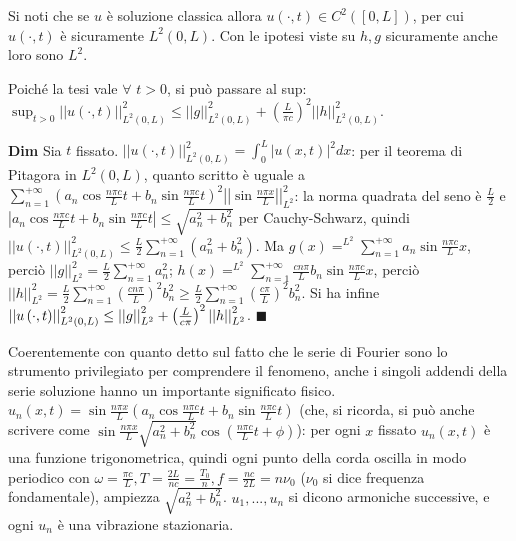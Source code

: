 \documentclass{article}
\begin{document}
Si noti che se $u$ \`{e} soluzione classica allora $u\left( \cdot ,t\right)
\in C^{2}\left( \left[ 0,L\right] \right) $, per cui $u\left( \cdot
,t\right) $ \`{e} sicuramente $L^{2}\left( 0,L\right) $. Con le ipotesi
viste su $h,g$ sicuramente anche loro sono $L^{2}$.

Poich\'{e} la tesi vale $\forall $ $t>0$, si pu\`{o} passare al sup: $%
\sup_{t>0}\left\vert \left\vert u\left( \cdot ,t\right) \right\vert
\right\vert _{L^{2}\left( 0,L\right) }^{2}\leq \left\vert \left\vert
g\right\vert \right\vert _{L^{2}\left( 0,L\right) }^{2}+\left( \frac{L}{\pi c%
}\right) ^{2}\left\vert \left\vert h\right\vert \right\vert _{L^{2}\left(
0,L\right) }^{2}$.

\textbf{Dim} Sia $t$ fissato. $\left\vert \left\vert u\left( \cdot ,t\right)
\right\vert \right\vert _{L^{2}\left( 0,L\right)
}^{2}=\int_{0}^{L}\left\vert u\left( x,t\right) \right\vert ^{2}dx$: per il
teorema di Pitagora in $L^{2}\left( 0,L\right) $, quanto scritto \`{e}
uguale a $\sum_{n=1}^{+\infty }\left( a_{n}\cos \frac{n\pi c}{L}t+b_{n}\sin 
\frac{n\pi c}{L}t\right) ^{2}\left\vert \left\vert \sin \frac{n\pi x}{L}%
\right\vert \right\vert _{L^{2}}^{2}$: la norma quadrata del seno \`{e} $%
\frac{L}{2}$ e $\left\vert a_{n}\cos \frac{n\pi c}{L}t+b_{n}\sin \frac{n\pi c%
}{L}t\right\vert \leq \sqrt{a_{n}^{2}+b_{n}^{2}}$ per Cauchy-Schwarz, quindi 
$\left\vert \left\vert u\left( \cdot ,t\right) \right\vert \right\vert
_{L^{2}\left( 0,L\right) }^{2}\leq \frac{L}{2}\sum_{n=1}^{+\infty }\left(
a_{n}^{2}+b_{n}^{2}\right) $. Ma $g\left( x\right)
=^{L^{2}}\sum_{n=1}^{+\infty }a_{n}\sin \frac{n\pi c}{L}x$, perci\`{o} $%
\left\vert \left\vert g\right\vert \right\vert _{L^{2}}^{2}=\frac{L}{2}%
\sum_{n=1}^{+\infty }a_{n}^{2}$; $h\left( x\right)
=^{L^{2}}\sum_{n=1}^{+\infty }\frac{cn\pi }{L}b_{n}\sin \frac{n\pi c}{L}x$,
perci\`{o} $\left\vert \left\vert h\right\vert \right\vert _{L^{2}}^{2}=%
\frac{L}{2}\sum_{n=1}^{+\infty }\left( \frac{cn\pi }{L}\right)
^{2}b_{n}^{2}\geq \frac{L}{2}\sum_{n=1}^{+\infty }\left( \frac{c\pi }{L}%
\right) ^{2}b_{n}^{2}$. Si ha infine $\left\vert \left\vert u\left( \cdot
,t\right) \right\vert \right\vert _{L^{2}\left( 0,L\right) }^{2}\leq
\left\vert \left\vert g\right\vert \right\vert _{L^{2}}^{2}+\left( \frac{L}{%
c\pi }\right) ^{2}\left\vert \left\vert h\right\vert \right\vert
_{L^{2}}^{2} $. $\blacksquare $

Coerentemente con quanto detto sul fatto che le serie di Fourier sono lo
strumento privilegiato per comprendere il fenomeno, anche i singoli addendi
della serie soluzione hanno un importante significato fisico. $u_{n}\left(
x,t\right) =\sin \frac{n\pi x}{L}\left( a_{n}\cos \frac{n\pi c}{L}%
t+b_{n}\sin \frac{n\pi c}{L}t\right) $ (che, si ricorda, si pu\`{o} anche
scrivere come $\sin \frac{n\pi x}{L}\sqrt{a_{n}^{2}+b_{n}^{2}}\cos \left( 
\frac{n\pi c}{L}t+\phi \right) $): per ogni $x$ fissato $u_{n}\left(
x,t\right) $ \`{e} una funzione trigonometrica, quindi ogni punto della
corda oscilla in modo periodico con $\omega =\frac{\pi c}{L},T=\frac{2L}{nc}=%
\frac{T_{0}}{n},f=\frac{nc}{2L}=n\nu _{0}$ ($\nu _{0}$ si dice frequenza
fondamentale), ampiezza $\sqrt{a_{n}^{2}+b_{n}^{2}}$. $u_{1},...,u_{n}$ si
dicono armoniche successive, e ogni $u_{n}$ \`{e} una vibrazione stazionaria.
\end{document}
